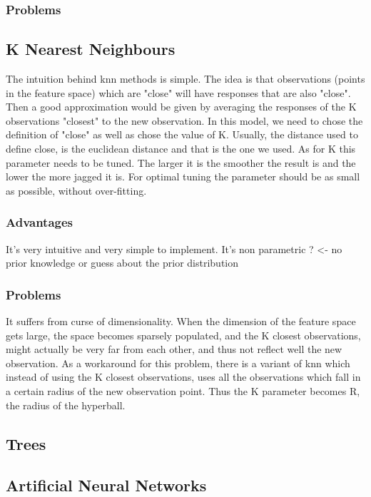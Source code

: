 \subsubsection{Problems}


\subsection{K Nearest Neighbours}
The intuition behind \acrshort{knn} methods is simple. The idea is that observations (points in the feature space) which are "close" will have responses that are also "close". Then a good approximation would be given by averaging the responses of the K observations "closest" to the new observation.
In this model, we need to chose the definition of "close" as well as chose the value of K.
Usually, the distance used to define close, is the euclidean distance and that is the one we used. As for K this parameter needs to be tuned. The larger it is the smoother the result is and the lower the more jagged it is. For optimal tuning the parameter should be as small as possible, without over-fitting.
\subsubsection{Advantages}
It's very intuitive and very simple to implement. 
It's non parametric ? <- no prior knowledge or guess about the prior distribution
\subsubsection{Problems}
It suffers from curse of dimensionality. When the dimension of the feature space gets large, the space becomes sparsely populated, and the K closest observations, might actually be very far from each other, and thus not reflect well the new observation.
As a workaround for this problem, there is a variant of \acrshort{knn} which instead of using the K closest observations, uses all the observations which fall in a certain radius of the new observation point. Thus the K parameter becomes R, the radius of the hyperball.
\subsection{Trees}
\subsection{Artificial Neural Networks}